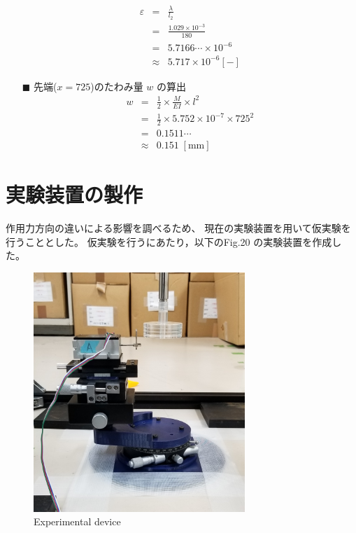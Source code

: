 \documentclass[twocolumn,a4j]{jsarticle}
\begin{document}
\begin{itemize}
\begin{eqnarray*}
                \varepsilon &=& \frac{\lambda}{l_2}\\
                &=& \frac{1.029 × 10^{-3}}{180}\\
                &=& 5.7166 \cdots × 10^{-6}\\
                &\approx& 5.717 × 10^{-6} \left[\mathrm{-}\right]
            \end{eqnarray*} 
        \item [$\blacksquare$] 先端($x=725$)のたわみ量 $w$ の算出
        \begin{eqnarray*}
            w &=& \frac{1}{2} × \frac{M}{EI} × l^2\\
            &=& \frac{1}{2} × 5.752 × 10^{-7} × 725^2\\
            &=& 0.1511 \cdots\\
            &\approx& 0.151 \;\left[\mathrm{mm}\right]
        \end{eqnarray*} 
    \end{itemize}

\section{実験装置の製作}
作用力方向の違いによる影響を調べるため、
現在の実験装置を用いて仮実験を行うこととした。
仮実験を行うにあたり，以下のFig.20 の実験装置を作成した。
\begin{figure}[htbp]
    \footnotesize
    \begin{center}
        \includegraphics[width=80mm]{../images/device_1.jpg}
        \caption{Experimental device}
    \end{center}
\end{figure}
\end{document}
